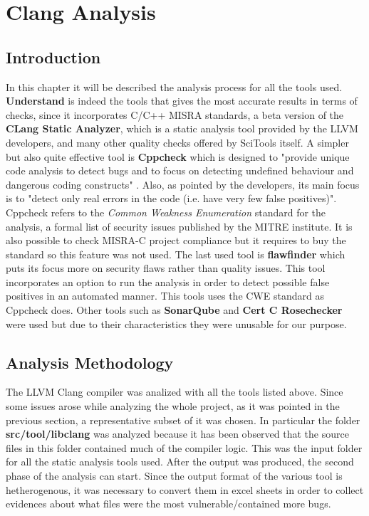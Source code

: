 \chapter{Clang Analysis}

\section{Introduction}

In this chapter it will be described the analysis process for all the tools used.\newline\newline
\textbf{Understand} is indeed the tools that gives the most accurate results in terms of checks, since it incorporates C/C++ MISRA standards, a beta version of the \textbf{CLang Static Analyzer}, which is a static analysis tool provided by the LLVM developers, and many other quality checks offered by SciTools itself.\newline
A simpler but also quite effective tool is \textbf{Cppcheck} which is designed to "provide unique code analysis to detect bugs and to focus on detecting undefined behaviour and dangerous coding constructs" \cite{bibitem2}. Also, as pointed by the developers, its main focus is to  "detect only real errors in the code (i.e. have very few false positives)". Cppcheck refers to the \textsl{Common Weakness Enumeration} standard for the analysis, a formal list of security issues published by the MITRE institute. It is also possible to check MISRA-C project compliance but it requires to buy the standard so this feature was not used. \newline
The last used tool is \textbf{flawfinder} which puts its focus more on security flaws rather than quality issues. This tool incorporates an option to run the analysis in order to detect possible false positives in an automated manner. This tools uses the CWE standard as Cppcheck does.\newline
Other tools such as \textbf{SonarQube} and \textbf{Cert C Rosechecker} were used but due to their characteristics they were unusable for our purpose.
\pagebreak

\section{Analysis Methodology}

The LLVM Clang compiler was analized with all the tools listed above.\newline
Since some issues arose while analyzing the whole project, as it was pointed in the previous section, a representative subset of it was chosen. In particular the folder \textbf{src/tool/libclang} was analyzed because it has been observed that the source files in this folder contained much of the compiler logic. This was the input folder for all the static analysis tools used.\newline\newline
After the output was produced, the second phase of the analysis can start. Since the output format of the various tool is hetherogenous, it was necessary to convert them in excel sheets in order to collect evidences about what files were the most vulnerable/contained more bugs.

